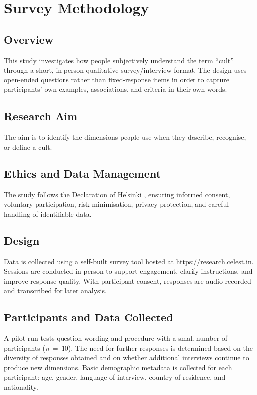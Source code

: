 \chapter{Survey Methodology}\label{ch:survey_methodology}

\section{Overview}
This study investigates how people subjectively understand the term \enquote{cult} through a short, in-person qualitative survey/interview format. The design uses open-ended questions rather than fixed-response items in order to capture participants' own examples, associations, and criteria in their own words.

\section{Research Aim}
The aim is to identify the dimensions people use when they describe, recognise, or define a cult.

\section{Ethics and Data Management}
The study follows the Declaration of Helsinki \parencite{wmaDeclarationHelsinki2013}, ensuring informed consent, voluntary participation, risk minimisation, privacy protection, and careful handling of identifiable data.

\section{Design}
Data is collected using a self-built survey tool hosted at \url{https://research.celest.in}. Sessions are conducted in person to support engagement, clarify instructions, and improve response quality. With participant consent, responses are audio-recorded and transcribed for later analysis.

\section{Participants and Data Collected}
A pilot run tests question wording and procedure with a small number of participants (\textit{n}~=~10). The need for further responses is determined based on the diversity of responses obtained and on whether additional interviews continue to produce new dimensions. Basic demographic metadata is collected for each participant: age, gender, language of interview, country of residence, and nationality.

